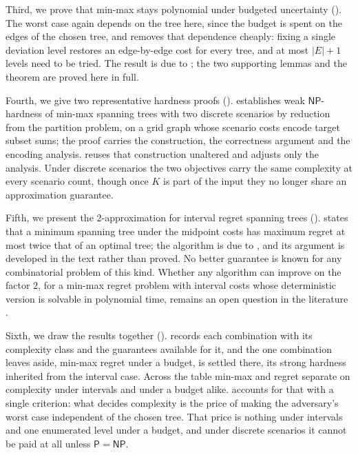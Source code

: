 Third, we prove that min-max stays polynomial under budgeted uncertainty ().
The worst case again depends on the tree here, since the budget is spent on the edges of the chosen tree, and  removes that dependence cheaply: fixing a single deviation level restores an edge-by-edge cost for every tree, and at most $|E| + 1$ levels need to be tried.
The result is due to \textcite{BertsimasSim2003}; the two supporting lemmas and the theorem are proved here in full.

Fourth, we give two representative hardness proofs ().
 establishes weak $\mathsf{NP}$-hardness of min-max spanning trees with two discrete scenarios by reduction from the partition problem, on a grid graph whose scenario costs encode target subset sums; the proof carries the construction, the correctness argument and the encoding analysis.
 reuses that construction unaltered and adjusts only the analysis.
Under discrete scenarios the two objectives carry the same complexity at every scenario count, though once $K$ is part of the input they no longer share an approximation guarantee.

Fifth, we present the 2-approximation for interval regret spanning trees ().
 states that a minimum spanning tree under the midpoint costs has maximum regret at most twice that of an optimal tree; the algorithm is due to \textcite{KasperskiZielinski2006}, and its argument is developed in the text rather than proved.
No better guarantee is known for any combinatorial problem of this kind.
Whether any algorithm can improve on the factor $2$, for a min-max regret problem with interval costs whose deterministic version is solvable in polynomial time, remains an open question in the literature \cite[Open Problem~2]{Goerigk2021RCO}.

Sixth, we draw the results together ().
 records each combination with its complexity class and the guarantees available for it, and the one combination  leaves aside, min-max regret under a budget, is settled there, its strong hardness inherited from the interval case.
Across the table min-max and regret separate on complexity under intervals and under a budget alike.
 accounts for that with a single criterion: what decides complexity is the price of making the adversary's worst case independent of the chosen tree.
That price is nothing under intervals and one enumerated level under a budget, and under discrete scenarios it cannot be paid at all unless $\mathsf{P} = \mathsf{NP}$.

